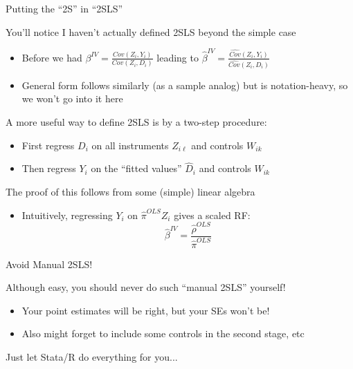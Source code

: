 \documentclass{beamer}
\begin{document}
\begin{frame}{Putting the ``2S'' in ``2SLS''}

You'll notice I haven't actually defined 2SLS beyond the simple case
\begin{itemize}
  \item Before we had $\beta^{IV}=\frac{Cov(Z_i,Y_i)}{Cov(Z_i,D_i)}$ leading to $\widehat\beta^{IV}=\frac{\widehat{Cov}(Z_i,Y_i)}{\widehat{Cov}(Z_i,D_i)}$ 
  \item General form follows similarly (as a sample analog) but is notation-heavy, so we won't go into it here
\end{itemize}
\pause

A more useful way to define 2SLS is by a two-step procedure:
\begin{itemize}
  \item First regress $D_i$ on all instruments $Z_{i\ell}$ and controls $W_{ik}$
  \item Then regress $Y_i$ on the ``fitted values'' $\widehat{D}_i$ and controls $W_{ik}$ 
\end{itemize}
\pause

The proof of this follows from some (simple) linear algebra 
\begin{itemize}
  \item Intuitively, regressing $Y_i$ on $\widehat{\pi}^{OLS}Z_i$ gives a scaled RF: 
  $$\widehat\beta^{IV}=\frac{\widehat{\rho}^{OLS}}{\widehat{\pi}^{OLS}}$$
\end{itemize}
\end{frame}

\begin{frame}{Avoid Manual 2SLS!}

Although easy, you should never do such ``manual 2SLS'' yourself!
\begin{itemize}
\item Your point estimates will be right, but your SEs won't be!\smallskip
\item Also might forget to include some controls in the second stage, etc
\end{itemize}
\bigskip
Just let Stata/R do everything for you...
\end{frame}
\end{document}
